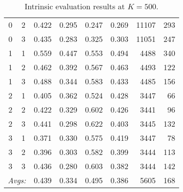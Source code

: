 \begin{table}[!h]
{\begin{tabular}{cc|ccccrr}
0 & 2 & 0.422 & 0.295 & 0.247 & 0.269 & 11107 & 293 \\%
0 & 3 & 0.435 & 0.283 & 0.325 & 0.303 & 11051 & 247 \\ \hline %
1 & 1 & 0.559 & 0.447 & 0.553 & 0.494 & 4488 & 340 \\%
1 & 2 & 0.462 & 0.392 & 0.567 & 0.463 & 4493 & 122 \\%
1 & 3 & 0.488 & 0.344 & 0.583 & 0.433 & 4485 & 156 \\ \hline %
2 & 1 & 0.405 & 0.362 & 0.524 & 0.428 & 3447 & 66 \\%
2 & 2 & 0.422 & 0.329 & 0.602 & 0.426 & 3441 & 96 \\%
2 & 3 & 0.441 & 0.298 & 0.622 & 0.403 & 3445 & 132 \\ \hline %
3 & 1 & 0.371 & 0.330 & 0.575 & 0.419 & 3447 & 78 \\%
3 & 2 & 0.396 & 0.303 & 0.582 & 0.399 & 3444 & 113 \\%
3 & 3 & 0.436 & 0.280 & 0.603 & 0.382 & 3444 & 142 \\ \hline \hline %
 \multicolumn{2}{r|}{\textit{Avgs:}} & 0.439 & 0.334 & 0.495 & 0.386 & 5605 & 168 \\
\end{tabular}
\label{subtab:intr-O-500}
}
\caption{
Intrinsic evaluation results at $K = 500$. 
}
\label{tab:intr-500}
\end{table}

